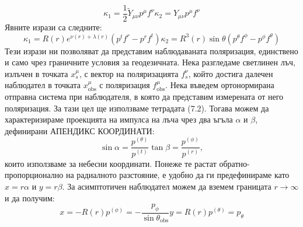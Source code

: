 \begin{subequations}
	\begin{equation}
		\kappa_1 = \frac{1}{2}\tilde{Y}_{\mu\nu}p^\mu f^\nu
	\end{equation}
	\begin{equation}
		\kappa_2 = Y_{\mu\nu}p^\mu f^\nu
	\end{equation}
\end{subequations}
Явните изрази са следните:
\begin{subequations}
	\begin{equation}
		\kappa_1 = R(r)e^{\nu(r) + \lambda(r)}\left( p^tf^r - p^rf^t \right)
	\end{equation}
	\begin{equation}
		\kappa_2 = R^3(r)\sin\theta\left(p^\theta f^\phi - p^\phi f^\theta\right)
	\end{equation}
\end{subequations}
Тези изрази ни позволяват да представим наблюдаваната поляризация, единствено и само чрез граничните условия за геодезичната. Нека разгледаме светлинен лъч, излъчен в точката $x^\mu_s$, с вектор на поляризацията $f^\nu_s$, който достига далечен наблюдател в точката $x^\mu_{\text{obs}}$ с поляризация $f^\mu_{\text{obs}}$. Нека въведем ортонормирана отправна система при наблюдателя, в която да представим измерената от него поляризация. За тази цел ще използваме тетрадата (7.2). Тогава можем да характеризираме проекцията на импулса на лъча чрез два ъгъла $\alpha$ и $\beta$, дефинирани АПЕНДИКС КООРДИНАТИ:
\begin{subequations}
	\begin{equation}
	\sin\alpha = \frac{p^{(\theta)}}{p^{(t)}}
	\end{equation}
	\begin{equation}
		\tan\beta = \frac{p^{(\phi)}}{p^{(r)}},
	\end{equation}
\end{subequations}
които използваме за небесни координати. Понеже те растат обратно-пропорционално на радиалното разстояние, е удобно да ги предефинираме като $x = r\alpha$ и $y = r\beta$. За асимптотичен наблюдател можем да вземем границата $r\rightarrow\infty$ и да получим:
\begin{subequations}
	\begin{equation}
		x = -R(r)p^{(\phi)} = -\frac{p_\phi}{\sin\theta_\text{obs}}
	\end{equation}
	\begin{equation}
		y = R(r)p^{(\theta)} = p_\theta
	\end{equation}
\end{subequations}

